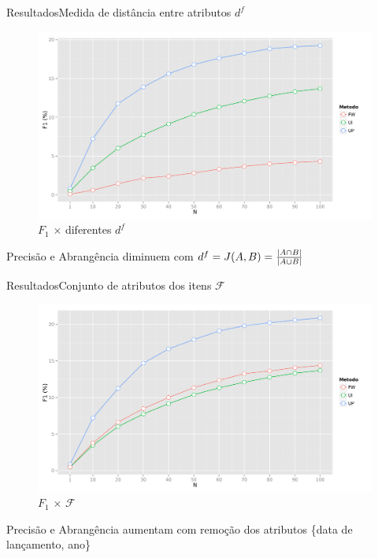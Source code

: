 \begin{frame}{Resultados}{Medida de distância entre atributos $d^f$}
\begin{figure}[ht]
    \begin{center}
    \includegraphics[width=.8\textwidth]{../img/F1_N_d}
    \end{center}
    \caption{$F_1$ $\times$ diferentes $d^f$}
    \label{fig:F1_N_d}
\end{figure}
\begin{center}
    Precisão e Abrangência diminuem com $d^f=J(A,B) ={{|A \cap B|}\over{|A \cup B|}}$
\end{center}
\end{frame}

\begin{frame}{Resultados}{Conjunto de atributos dos itens  $\mathcal{F}$}
\begin{figure}[ht]
    \begin{center}
    \includegraphics[width=.8\textwidth]{../img/F1_N_F}
    \end{center}
    \caption{$F_1$ $\times$ $\mathcal{F}$}
    \label{fig:F1_N_F}
\end{figure}
\begin{center}
    Precisão e Abrangência aumentam com remoção dos atributos \{data de lançamento, ano\}
\end{center}
\end{frame}




